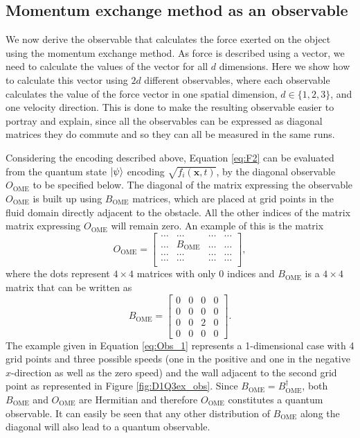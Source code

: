 \subsection{Momentum exchange method as an observable}\label{subseq:obs}
We now derive the observable that calculates the force exerted on the object using the momentum exchange method. As force is described using a vector, we need to calculate the values of the vector for all $d$ dimensions. Here we show how to calculate this vector using $2d$ different observables, where each observable calculates the value of the force vector in one spatial dimension, $d\in\{1,2,3\}$, and one velocity direction. This is done to make the resulting observable easier to portray and explain, since all the observables can be expressed as diagonal matrices they do commute and so they can all be measured in the same runs. 

Considering the encoding described above, Equation \eqref{eq:F2} can be evaluated from the quantum state $\ket{\psi}$ encoding $\sqrt{ f_i \left (\mathbf{x},t \right )}$, by the diagonal observable $O_{\text{OME}}$ to be specified below. The diagonal of the matrix expressing the observable $O_\text{OME}$ is built up using $B_{\text{OME}}$ matrices, which are placed at grid points in the fluid domain directly adjacent to the obstacle. All the other indices of the matrix matrix expressing $O_{\text{OME}}$ will remain zero. An example of this is the matrix
\begin{equation}\label{eq:Obs_1}
        O_{\text{OME}} = \begin{bmatrix}
            \dots & \dots & \dots & \dots  \\
            \dots &  B_{\text{OME}} & \dots & \dots \\
            \dots & \dots & \dots & \dots \\
            \dots & \dots & \dots & \dots \\
        \end{bmatrix},
\end{equation}
where the dots represent $4 \times 4$ matrices with only 0 indices and $B_{\text{OME}}$ is a $4 \times 4$ matrix that can be written as 
\begin{equation}\label{eq:bmatrix}
    B_{\text{OME}} = \begin{bmatrix}
        0 & 0 & 0 & 0\\
        0 & 0 & 0 & 0 \\
        0 & 0 & 2 & 0 \\
        0 & 0 & 0 & 0 
    \end{bmatrix}.
\end{equation}
The example given in Equation \eqref{eq:Obs_1} represents a 1-dimensional case with 4 grid points and three possible speeds (one in the positive and one in the negative $x$-direction as well as the zero speed) and the wall adjacent to the second grid point as represented in Figure \ref{fig:D1Q3ex_obs}. Since $B_{\text{OME}} = B_{\text{OME}}^{\dagger}$, both $B_{\text{OME}}$ and $O_{\text{OME}}$ are Hermitian and therefore $O_{\text{OME}}$ constitutes a quantum observable. It can easily be seen that any other distribution of $B_{\text{OME}}$ along the diagonal will also lead to a quantum observable. 

